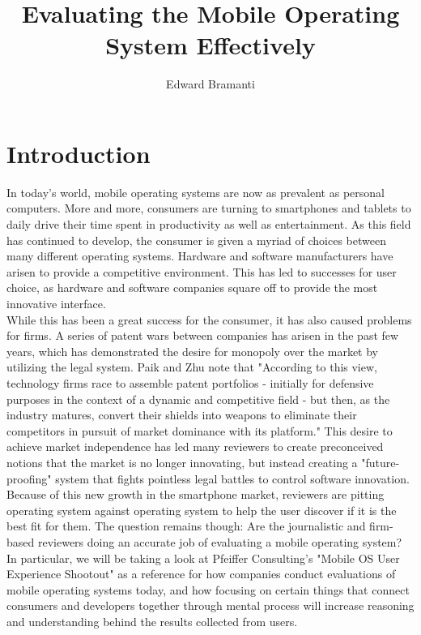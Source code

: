\documentclass[11pt]{article}
\title{Evaluating the Mobile Operating System Effectively}
\author{Edward Bramanti}
\begin{document}
\maketitle
\begin{abstract}
\end{abstract}
\pagebreak
\section{Introduction}
In today's world, mobile operating systems are now as prevalent as personal computers. More and more, consumers are turning to smartphones and tablets to daily drive their time spent in productivity as well as entertainment. As this field has continued to develop, the consumer is given a myriad of choices between many different operating systems. Hardware and software manufacturers have arisen to provide a competitive environment. This has led to successes for user choice, as hardware and software companies square off to provide the most innovative interface.\\
\indent While this has been a great success for the consumer, it has also caused problems for firms. A series of patent wars between companies has arisen in the past few years, which has demonstrated the desire for monopoly over the market by utilizing the legal system. Paik and Zhu note that "According to this view, technology firms race to assemble patent portfolios - initially for defensive purposes in the context of a dynamic and competitive field - but then, as the industry matures, convert their shields into weapons to eliminate their competitors in pursuit of market dominance with its platform."\cite{PatentWars} This desire to achieve market independence has led many reviewers to create preconceived notions that the market is no longer innovating, but instead creating a "future-proofing" system that fights pointless legal battles to control software innovation.\\
\indent Because of this new growth in the smartphone market, reviewers are pitting operating system against operating system to help the user discover if it is the best fit for them. The question remains though: Are the journalistic and firm-based reviewers doing an accurate job of evaluating a mobile operating system? In particular, we will be taking a look at Pfeiffer Consulting's "Mobile OS User Experience Shootout" as a reference for how companies conduct evaluations of mobile operating systems today, and how focusing on certain things that connect consumers and developers together through mental process will increase reasoning and understanding behind the results collected from users.
\end{document}
